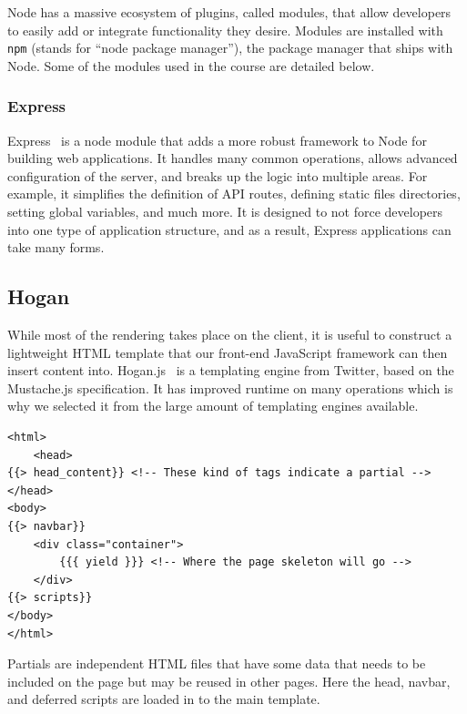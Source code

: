 \documentclass[12pt]{article}
\newcommand{\code}[1]{{\texttt {#1}}}
\begin{document}
Node has a massive ecosystem of plugins, called modules, that allow developers to easily add or integrate functionality they desire. 
Modules are installed with \code{npm} (stands for ``node package manager''), the package manager that ships with Node. 
Some of the modules used in the course are detailed below.

\subsubsection{Express}\label{sec:express}
Express~\cite{Express} is a node module that adds a more robust framework to Node for building web applications. 
It handles many common operations, allows advanced configuration of the server, and breaks up the logic into multiple areas.  
For example, it simplifies the definition of API routes, defining static files directories, setting global variables, and much more. 
It is designed to not force developers into one type of application structure, and as a result, Express applications can take many forms.

\subsection{Hogan}\label{sec:hogan}
While most of the rendering takes place on the client, it is useful to construct a lightweight HTML template that our front-end JavaScript framework can then insert content into. 
Hogan.js~\cite{Hogan} is a templating engine from Twitter, based on the Mustache.js specification. 
It has improved runtime on many operations which is why we selected it from the large amount of templating engines available.
\begin{verbatim}
<html>
	<head>
{{> head_content}} <!-- These kind of tags indicate a partial -->
</head>
<body>
{{> navbar}} 
    <div class="container">
        {{{ yield }}} <!-- Where the page skeleton will go -->
    </div>
{{> scripts}}
</body>
</html>
\end{verbatim}
Partials are independent HTML files that have some data that needs to be included on the page but may be reused in other pages. 
Here the head, navbar, and deferred scripts are loaded in to the main template.
\end{document}
